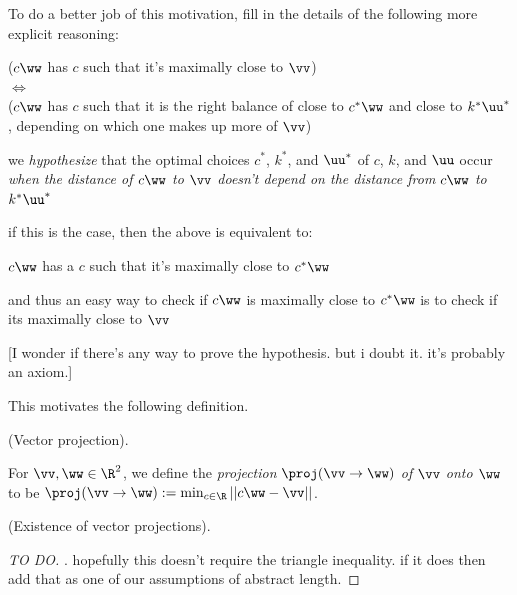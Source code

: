 \begin{remark}
	[Important TO-DO:]
	
	To do a better job of this motivation, fill in the details of the following more explicit reasoning:
	
	\begin{center}
		($c\ww$ has $c$ such that it's maximally close to $\vv$) \\ $\iff$ \\
		($c\ww$ has $c$ such that it is the right balance of close to $c^*\ww$ and close to $k^*\uu^*$, depending on which one makes up more of $\vv$)
	\end{center}
	
	we \textit{hypothesize} that the optimal choices $c^*$, $k^*$, and $\uu^*$ of $c$, $k$, and $\uu$ occur \textit{when the distance of $c\ww$ to $\vv$ doesn't depend on the distance from $c\ww$ to $k^*\uu^*$}
	
	if this is the case, then the above is equivalent to:
	
	\begin{center}
			$c\ww$ has a $c$ such that it's maximally close to $c^*\ww$
	\end{center}
	
	and thus an easy way to check if $c\ww$ is maximally close to $c^*\ww$ is to check if its maximally close to $\vv$
	
	[I wonder if there's any way to prove the hypothesis. but i doubt it. it's probably an axiom.]
\end{remark}

This motivates the following definition.

\begin{defn}
\label{ch::lin_alg::defn::vector_proj}
	(Vector projection).
	
	For $\vv, \ww \in \R^2$, we define the \textit{projection} $\proj(\vv \rightarrow \ww)$ \textit{of $\vv$ onto $\ww$} to be $\proj(\vv \rightarrow \ww) := \min_{c \in \R} ||c\ww - \vv||$.
\end{defn}

\begin{theorem}
	(Existence of vector projections).
\end{theorem}

\begin{proof}
	[TO DO]. hopefully this doesn't require the triangle inequality. if it does then add that as one of our assumptions of abstract length.
\end{proof}

